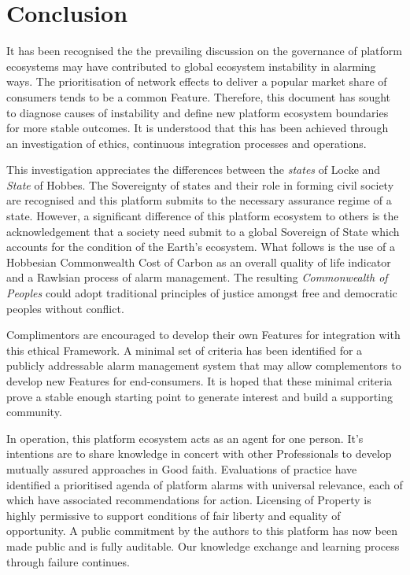 \documentclass[11pt, oneside]{book}   	%
\begin{document}
\pagebreak

\chapter{Conclusion}
It has been recognised the the prevailing discussion on the governance of platform ecosystems may have contributed to global ecosystem instability in alarming ways.
The prioritisation of network effects to deliver a popular market share of consumers tends to be a common Feature.
Therefore, this document has sought to diagnose causes of instability and define new platform ecosystem boundaries for more stable outcomes.
It is understood that this has been achieved through an investigation of ethics, continuous integration processes and operations.\

This investigation appreciates the differences between the \emph{states} of Locke and \emph{State} of Hobbes.
The Sovereignty of states and their role in forming civil society are recognised and this platform submits to the necessary assurance regime of a state.
However, a significant difference of this platform ecosystem to others is the acknowledgement that a society need submit to a global Sovereign of State which accounts for the condition of the Earth's ecosystem.
What follows is the use of a Hobbesian Commonwealth Cost of Carbon as an overall quality of life indicator and a Rawlsian process of alarm management.
The resulting \emph{Commonwealth of Peoples} could adopt traditional principles of justice amongst free and democratic peoples without conflict.\

Complimentors are encouraged to develop their own Features for integration with this ethical Framework.
A minimal set of criteria has been identified for a publicly addressable alarm management system that may allow complementors to develop new Features for end-consumers.
It is hoped that these minimal criteria prove a stable enough starting point to generate interest and build a supporting community.\

In operation, this platform ecosystem acts as an agent for one person.
It's intentions are to share knowledge in concert with other Professionals to develop mutually assured approaches in Good faith.
Evaluations of practice have identified a prioritised agenda of platform alarms with universal relevance, each of which have associated recommendations for action.
Licensing of Property is highly permissive to support conditions of fair liberty and equality of opportunity.
A public commitment by the authors to this platform has now been made public and is fully auditable.
Our knowledge exchange and learning process through failure continues.\
\end{document}
